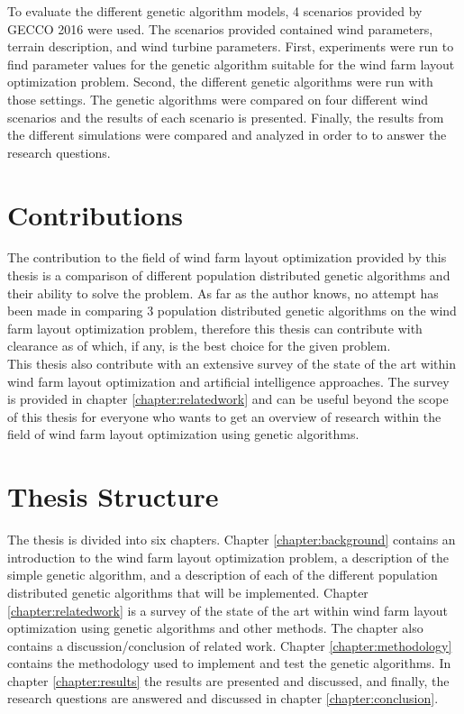 \noindent To evaluate the different genetic algorithm models, 4 scenarios provided by GECCO 2016 were used. The scenarios provided contained wind parameters, terrain description, and wind turbine parameters. First, experiments were run to find parameter values for the genetic algorithm suitable for the wind farm layout optimization problem. Second, the different genetic algorithms were run with those settings. The genetic algorithms were compared on four different wind scenarios and the results of each scenario is presented. Finally, the results from the different simulations were compared and analyzed in order to to answer the research questions.


\section{Contributions}\label{section:introduction contributions}
The contribution to the field of wind farm layout optimization provided by this thesis is a comparison of different population distributed genetic algorithms and their ability to solve the problem. As far as the author knows, no attempt has been made in comparing 3 population distributed genetic algorithms on the wind farm layout optimization problem, therefore this thesis can contribute with clearance as of which, if any, is the best choice for the given problem.\\

\noindent This thesis also contribute with an extensive survey of the state of the art within wind farm layout optimization and artificial intelligence approaches. The survey is provided in chapter \ref{chapter:relatedwork} and can be useful beyond the scope of this thesis for everyone who wants to get an overview of research within the field of wind farm layout optimization using genetic algorithms.\\


\section{Thesis Structure}\label{thesisstructure}
The thesis is divided into six chapters. Chapter \ref{chapter:background} contains an introduction to the wind farm layout optimization problem, a description of the simple genetic algorithm, and a description of each of the different population distributed genetic algorithms that will be implemented. Chapter \ref{chapter:relatedwork} is a survey of the state of the art within wind farm layout optimization using genetic algorithms and other methods. The chapter also contains a discussion/conclusion of related work. Chapter \ref{chapter:methodology} contains the methodology used to implement and test the genetic algorithms. In chapter \ref{chapter:results} the results are presented and discussed, and finally, the research questions are answered and discussed in chapter \ref{chapter:conclusion}.